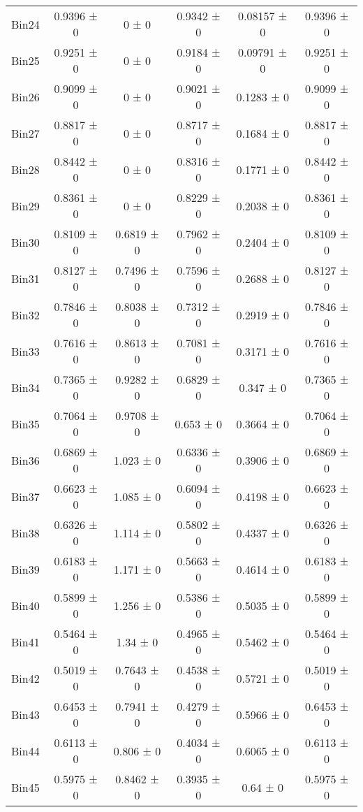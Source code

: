 \begin{tabular}{@{\extracolsep{4pt}}lccccc@{}}
     Bin24 & 0.9396 ± 0 & 0 ± 0 & 0.9342 ± 0 & 0.08157 ± 0 & 0.9396 ± 0 \\ 
     Bin25 & 0.9251 ± 0 & 0 ± 0 & 0.9184 ± 0 & 0.09791 ± 0 & 0.9251 ± 0 \\ 
     Bin26 & 0.9099 ± 0 & 0 ± 0 & 0.9021 ± 0 & 0.1283 ± 0 & 0.9099 ± 0 \\ 
     Bin27 & 0.8817 ± 0 & 0 ± 0 & 0.8717 ± 0 & 0.1684 ± 0 & 0.8817 ± 0 \\ 
     Bin28 & 0.8442 ± 0 & 0 ± 0 & 0.8316 ± 0 & 0.1771 ± 0 & 0.8442 ± 0 \\ 
     Bin29 & 0.8361 ± 0 & 0 ± 0 & 0.8229 ± 0 & 0.2038 ± 0 & 0.8361 ± 0 \\ 
     Bin30 & 0.8109 ± 0 & 0.6819 ± 0 & 0.7962 ± 0 & 0.2404 ± 0 & 0.8109 ± 0 \\ 
     Bin31 & 0.8127 ± 0 & 0.7496 ± 0 & 0.7596 ± 0 & 0.2688 ± 0 & 0.8127 ± 0 \\ 
     Bin32 & 0.7846 ± 0 & 0.8038 ± 0 & 0.7312 ± 0 & 0.2919 ± 0 & 0.7846 ± 0 \\ 
     Bin33 & 0.7616 ± 0 & 0.8613 ± 0 & 0.7081 ± 0 & 0.3171 ± 0 & 0.7616 ± 0 \\ 
     Bin34 & 0.7365 ± 0 & 0.9282 ± 0 & 0.6829 ± 0 & 0.347 ± 0 & 0.7365 ± 0 \\ 
     Bin35 & 0.7064 ± 0 & 0.9708 ± 0 & 0.653 ± 0 & 0.3664 ± 0 & 0.7064 ± 0 \\ 
     Bin36 & 0.6869 ± 0 & 1.023 ± 0 & 0.6336 ± 0 & 0.3906 ± 0 & 0.6869 ± 0 \\ 
     Bin37 & 0.6623 ± 0 & 1.085 ± 0 & 0.6094 ± 0 & 0.4198 ± 0 & 0.6623 ± 0 \\ 
     Bin38 & 0.6326 ± 0 & 1.114 ± 0 & 0.5802 ± 0 & 0.4337 ± 0 & 0.6326 ± 0 \\ 
     Bin39 & 0.6183 ± 0 & 1.171 ± 0 & 0.5663 ± 0 & 0.4614 ± 0 & 0.6183 ± 0 \\ 
     Bin40 & 0.5899 ± 0 & 1.256 ± 0 & 0.5386 ± 0 & 0.5035 ± 0 & 0.5899 ± 0 \\ 
     Bin41 & 0.5464 ± 0 & 1.34 ± 0 & 0.4965 ± 0 & 0.5462 ± 0 & 0.5464 ± 0 \\ 
     Bin42 & 0.5019 ± 0 & 0.7643 ± 0 & 0.4538 ± 0 & 0.5721 ± 0 & 0.5019 ± 0 \\ 
     Bin43 & 0.6453 ± 0 & 0.7941 ± 0 & 0.4279 ± 0 & 0.5966 ± 0 & 0.6453 ± 0 \\ 
     Bin44 & 0.6113 ± 0 & 0.806 ± 0 & 0.4034 ± 0 & 0.6065 ± 0 & 0.6113 ± 0 \\ 
     Bin45 & 0.5975 ± 0 & 0.8462 ± 0 & 0.3935 ± 0 & 0.64 ± 0 & 0.5975 ± 0 \\ 

\end{tabular}
